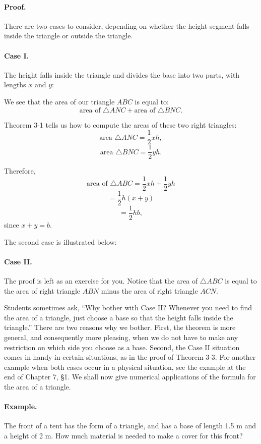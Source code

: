 \documentclass[12pt]{book} %
\begin{document}
\paragraph{Proof.}
There are two cases to consider, depending on whether the height segment falls inside the triangle or outside the triangle.

\paragraph{Case I.}
The height falls inside the triangle and divides the base into two parts, with lengths $x$ and $y$:


We see that the area of our triangle $ABC$ is equal to:
\[
\text{area of }\triangle ANC + \text{area of }\triangle BNC.
\]

Theorem 3-1 tells us how to compute the areas of these two right triangles:
\[
\text{area }\triangle ANC = \frac12 xh,
\]
\[
\text{area }\triangle BNC = \frac12 yh.
\]

Therefore,
\[
\text{area of }\triangle ABC = \frac12 xh + \frac12 yh
\]
\[
= \frac12 h(x+y)
\]
\[
= \frac12 hb,
\]
since $x+y=b$.

The second case is illustrated below:

\paragraph{Case II.}


The proof is left as an exercise for you. Notice that the area of $\triangle ABC$ is equal to the area of right triangle $ABN$ minus the area of right triangle $ACN$.

Students sometimes ask, ``Why bother with Case II? Whenever you need to find the area of a triangle, just choose a base so that the height falls inside the triangle.'' There are two reasons why we bother. First, the theorem is more general, and consequently more pleasing, when we do not have to make any restriction on which side you choose as a base. Second, the Case II situation comes in handy in certain situations, as in the proof of Theorem 3-3. For another example when both cases occur in a physical situation, see the example at the end of Chapter 7, \S 1. We shall now give numerical applications of the formula for the area of a triangle.

\paragraph{Example.}
The front of a tent has the form of a triangle, and has a base of length 1.5 m and a height of 2 m. How much material is needed to make a cover for this front?
\end{document}
